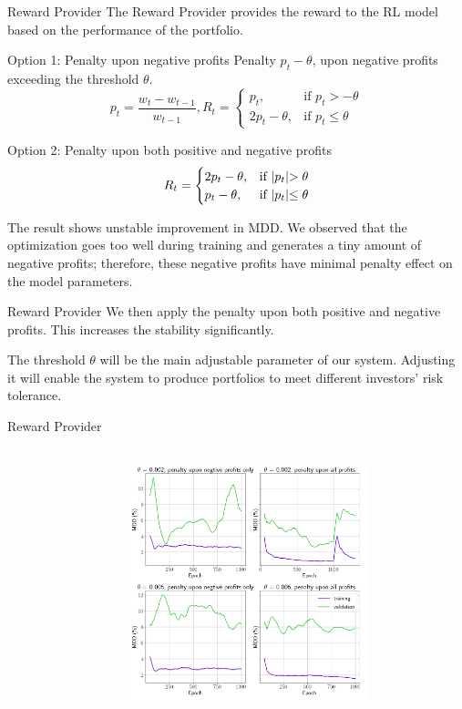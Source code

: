 \begin{frame}{Reward Provider}
The Reward Provider provides the reward to the RL model based on the performance of the portfolio.
\begin{block}{Option 1: Penalty upon negative profits}
Penalty \(p_t-\theta\), upon negative profits exceeding the threshold \(\theta\). 
\[
p_t = \frac{w_t-w_{t-1}}{w_{t-1}}
, 
R_t = 
\begin{cases}
    p_t,&\text{if  }p_t > -\theta\\
    2p_t - \theta ,&\text{if  }p_t \leq  \theta
\end{cases}
\]
\end{block}
\begin{block}{Option 2: Penalty upon both positive and negative profits}
\[
R_t = 
\begin{cases}
    2p_t - \theta,&\text{if  }    $$|p_t|$$ > \theta\\
    p_t - \theta ,&\text{if  } $$|p_t|$$\leq  \theta
\end{cases}
\]
\end{block}
\alert{
The result shows unstable improvement in MDD. We observed that the optimization goes too well during training and generates a tiny amount of negative profits; therefore, these negative profits have minimal penalty effect on the model parameters.
}

\end{frame}

\begin{frame}{Reward Provider}
We then apply the penalty upon both positive and negative profits. This increases the stability significantly.

The threshold \(\theta\) will be the main adjustable parameter of our system. Adjusting it will enable the system to produce portfolios to meet different investors' risk tolerance.
\end{frame}
\begin{frame}{Reward Provider}
\begin{columns}
\begin{column}{0.25\textwidth}
\end{column}
\begin{column}{0.75\textwidth}
\begin{center}
      \includegraphics[height=7cm]{images/penalty_negtive_profits_compare.png}
\end{center}
\end{column}
\end{columns}
\end{frame}

